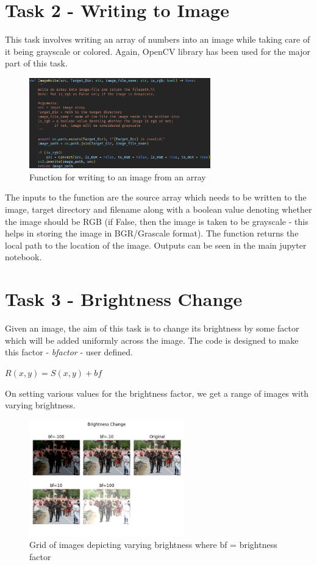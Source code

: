 \documentclass[notitlepage]{report}
\begin{document}
\section{Task 2 - Writing to Image}  
This task involves writing an array of numbers into an image while taking care of it being grayscale
or colored. Again, OpenCV library has been used for the major part of this task. 

\begin{figure}[htp]
    \centering
    \hypertarget{C2}{\includegraphics[width = 0.7\textwidth]{C2.png}}
    \caption{Function for writing to an image from an array}
    \label{fig2:sysfig}
\end{figure}

The inputs to the function are the source array which needs to be written to the image, target directory 
and filename along with a boolean value denoting whether the image should be RGB (if False, then the image is taken to
be grayscale - this helps in storing the image in BGR/Grascale format). The function returns the local path to the 
location of the image. Outputs can be seen in the main jupyter notebook.

\section{Task 3 - Brightness Change}
Given an image, the aim of this task is to change its brightness by some factor which will be added uniformly across the 
image. The code is designed to make this factor - \textit{b\textunderscore factor} - user defined.

\begin{center}
    $R(x, y) = S(x, y) + bf$
\end{center}

On setting various values for the brightness factor, we get a range of images with varying brightness.

\begin{figure}[htp]
    \centering
    \hypertarget{BF}{\includegraphics[width = 0.6\textwidth]{BF.png}}
    \caption{Grid of images depicting varying brightness where bf = brightness factor}
    \label{fig3:sysfig}
\end{figure}
\end{document}
